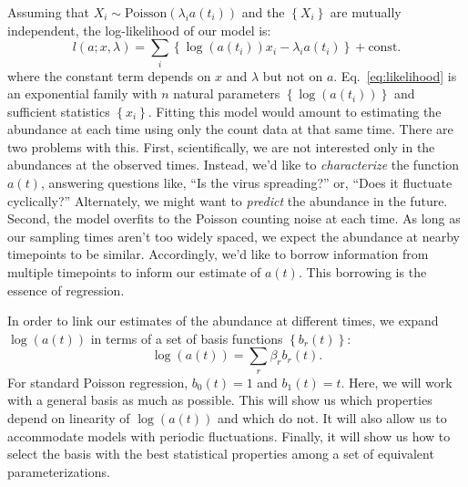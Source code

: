 \documentclass[12pt, letterpaper]{article}
\begin{document}
Assuming that $X_i \sim \text{Poisson}\left(\lambda_i a(t_i)\right)$ and the $\left\{X_i\right\}$ are mutually independent, the log-likelihood of our model is:
\begin{equation}
    l(a; x, \lambda) = \sum_i \left\{\log(a(t_i)) x_i - \lambda_i a(t_i) \right\} + \text{const.}
    \label{eq:likelihood}
\end{equation}
where the constant term depends on $x$ and $\lambda$ but not on $a$.
Eq.~\ref{eq:likelihood} is an exponential family with $n$ natural parameters $\left\{\log(a(t_i))\right\}$ and sufficient statistics $\left\{x_i\right\}$.
Fitting this model would amount to estimating the abundance at each time using only the count data at that same time.
There are two problems with this.
First, scientifically, we are not interested only in the abundances at the observed times.
Instead, we'd like to \emph{characterize} the function $a(t)$, answering questions like, ``Is the virus spreading?'' or, ``Does it fluctuate cyclically?''
Alternately, we might want to \emph{predict} the abundance in the future.
Second, the model overfits to the Poisson counting noise at each time.
As long as our sampling times aren't too widely spaced, we expect the abundance at nearby timepoints to be similar.
Accordingly, we'd like to borrow information from multiple timepoints to inform our estimate of $a(t)$.
This borrowing is the essence of regression.

In order to link our estimates of the abundance at different times, we expand $\log(a(t))$ in terms of a set of basis functions $\left\{b_r(t)\right\}$:
\begin{equation}
    \log(a(t)) = \sum_r \beta_r b_r(t).
    \label{eq:basis}
\end{equation}
For standard Poisson regression, $b_0(t) = 1$ and $b_1(t) = t$.
Here, we will work with a general basis as much as possible.
This will show us which properties depend on linearity of $\log(a(t))$ and which do not.
It will also allow us to accommodate models with periodic fluctuations.
Finally, it will show us how to select the basis with the best statistical properties among a set of equivalent parameterizations.
\end{document}

